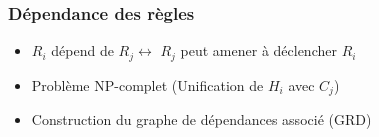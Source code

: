 \begin{frame}
	\frametitle{Dépendance des règles}
	\begin{itemize}
		\item $R_i$ dépend de $R_j \leftrightarrow $ $R_j$ peut amener à déclencher $R_i$
		\item Problème NP-complet (Unification de $H_i$ avec $C_j$)
		\item Construction du graphe de dépendances associé (GRD)
	\end{itemize}
\end{frame}



